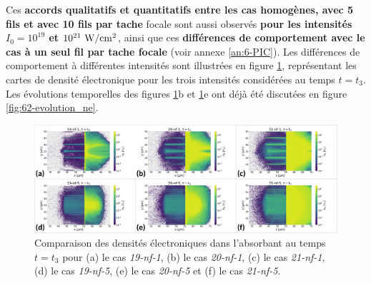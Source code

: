 \begin{refsection}
Ces \textbf{accords qualitatifs et quantitatifs entre les cas homogènes, avec 5 fils et avec 10 fils par tache} focale sont aussi observés \textbf{pour les intensités $I_0=10^{19}$ et $10^{21} ~ \rm W/cm^2$}, ainsi que ces \textbf{différences de comportement avec le cas à un seul fil par tache focale} (voir annexe \ref{an:6-PIC}). Les différences de comportement à différentes intensités sont illustrées en figure \ref{fig:62-comparaison_intensite}, représentant les cartes de densité électronique pour les trois intensités considérées au temps $t=t_3$. Les évolutions temporelles des figures \ref{fig:62-comparaison_intensite}b et \ref{fig:62-comparaison_intensite}e ont déjà été discutées en figure \ref{fig:62-evolution_ne}.

\begin{figure}[hbtp]
	\centering
	\includegraphics[width=\linewidth]{6-opti_numerique/comparaison_intensite_ne_t3.png}
	\caption{Comparaison des densités électroniques dans l'absorbant au temps $t=t_3$ pour (a) le cas \textit{19-nf-1}, (b) le cas \textit{20-nf-1}, (c) le cas \textit{21-nf-1}, (d) le cas \textit{19-nf-5}, (e) le cas \textit{20-nf-5} et (f) le cas \textit{21-nf-5}.}
	\label{fig:62-comparaison_intensite}
\end{figure}


\end{refsection}
